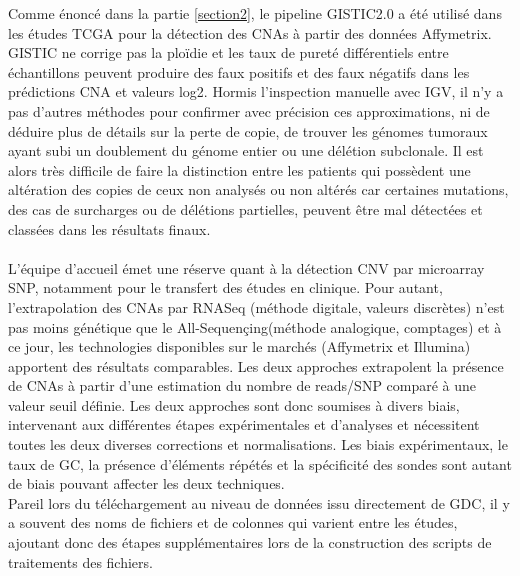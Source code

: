 \documentclass{style}
\begin{document}
Comme énoncé dans la partie \ref{section2}, le pipeline GISTIC2.0 a été utilisé dans les études TCGA pour la détection des CNAs à partir des données Affymetrix. GISTIC ne corrige pas la ploïdie et les taux de pureté différentiels entre échantillons peuvent produire des faux positifs et des faux négatifs dans les prédictions CNA et valeurs log2. Hormis l’inspection manuelle avec IGV, il n’y a pas d’autres méthodes pour confirmer avec précision ces approximations, ni de déduire plus de détails sur la perte de copie, de trouver les génomes tumoraux ayant subi un doublement du génome entier ou une délétion subclonale. Il est alors très difficile de faire la distinction entre les patients qui possèdent une altération des copies de ceux non analysés ou non altérés car certaines mutations, des cas de surcharges ou de délétions partielles, peuvent être mal détectées et classées dans les résultats finaux. \\ \\ 
L’équipe d'accueil émet une réserve quant à la détection CNV par microarray SNP, notamment pour le transfert des études en clinique. Pour autant, l'extrapolation des CNAs par RNASeq (méthode digitale, valeurs discrètes)  n’est pas moins génétique que le All-Sequençing(méthode analogique, comptages) et à ce jour, les technologies disponibles sur le marchés (Affymetrix et Illumina) apportent des résultats comparables. Les deux approches extrapolent la présence de CNAs à partir d’une estimation du nombre de reads/SNP comparé à une valeur seuil définie. Les deux approches sont donc soumises à divers biais, intervenant aux différentes étapes expérimentales et d'analyses et nécessitent toutes les deux diverses corrections et normalisations. Les biais expérimentaux, le taux de GC, la présence d’éléments répétés et la spécificité des sondes sont autant de biais pouvant affecter les deux techniques. \\
Pareil lors du téléchargement au niveau de données issu directement de GDC, il y a souvent des noms de fichiers et de colonnes qui varient entre les études, ajoutant donc des étapes supplémentaires lors de la construction des scripts de traitements des fichiers. \\
\end{document}
